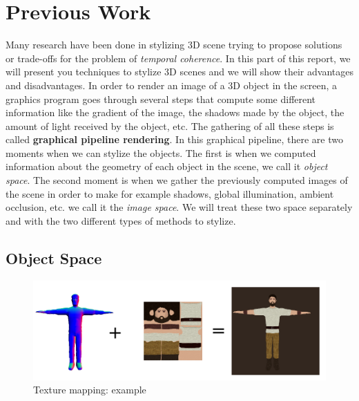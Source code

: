 \chapter{Previous Work}

Many research have been done in stylizing 3D scene\cite{schmid_overcoat:_2011, praun_real-time_2001, klein_non-photorealistic_2000, benard_dynamic_2009, benard_dynamic_2010, freudenberg_walk-through_2001, benard_state---art_2011} trying to propose solutions or trade-offs for the problem of \textit{temporal coherence}. In this part of this report, we will present you techniques to stylize 3D scenes and we will show their advantages and disadvantages. In order to render an image of a 3D object in the screen, a graphics program goes through several steps that compute some different information like the gradient of the image, the shadows made by the object, the amount of light received by the object, etc. The gathering of all these steps is called \textbf{graphical pipeline rendering}. In this graphical pipeline, there are two moments when we can stylize the objects. The first is when we computed information about the geometry of each object in the scene, we call it \textit{object space}. The second moment is when we gather the previously computed images of the scene in order to make for example shadows, global illumination, ambient occlusion, etc. we call it the \textit{image space}. We will treat these two space separately and with the two different types of methods to stylize.



\section{Object Space}


\begin{figure}
    \begin{center}
    \includegraphics[scale=0.4]{pics/texture_mapping.png}
    \end{center}
    \caption{Texture mapping: example}
    \label{texture_mapping}
\end{figure}

